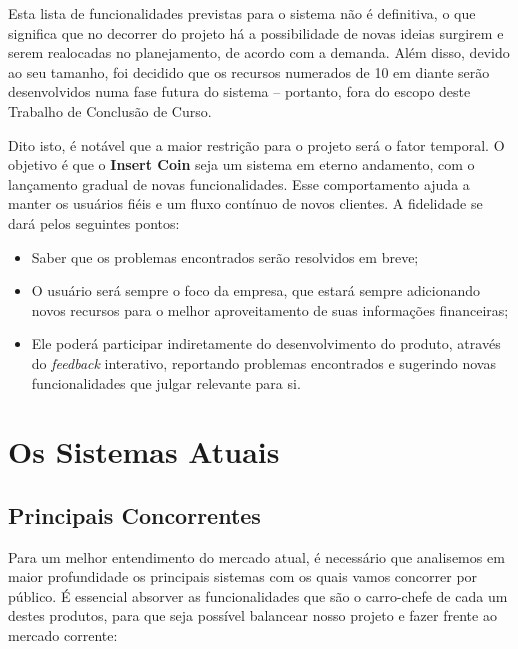 \documentclass[a4paper]{abnt}
\begin{document}
Esta lista de funcionalidades previstas para o sistema n\~ao é definitiva, o que significa que no decorrer do projeto há a possibilidade de novas ideias surgirem e serem realocadas no planejamento, de acordo com a demanda. Além disso, devido ao seu tamanho, foi decidido que os recursos numerados de 10 em diante ser\~ao desenvolvidos numa fase futura do sistema -- portanto, fora do escopo deste Trabalho de Conclus\~ao de Curso.

Dito isto, é notável que a maior restriç\~ao para o projeto será o fator temporal. O objetivo é que o \textbf{Insert Coin} seja um sistema em eterno andamento, com o lançamento gradual de novas funcionalidades. Esse comportamento ajuda a manter os usuários fiéis e um fluxo contínuo de novos clientes. A fidelidade se dará pelos seguintes pontos:
\begin{itemize}
	\item Saber que os problemas encontrados ser\~ao resolvidos em breve;
	\item O usuário será sempre o foco da empresa, que estará sempre adicionando novos recursos para o melhor aproveitamento de suas informaç\~oes financeiras;
	\item Ele poderá participar indiretamente do desenvolvimento do produto, através do \emph{feedback} interativo, reportando problemas encontrados e sugerindo novas funcionalidades que julgar relevante para si.
\end{itemize}

\chapter{Os Sistemas Atuais}

\section{Principais Concorrentes}
Para um melhor entendimento do mercado atual, é necessário que analisemos em maior profundidade os principais sistemas com os quais vamos concorrer por público. É essencial absorver as funcionalidades que s\~ao o carro-chefe de cada um destes produtos, para que seja possível balancear nosso projeto e fazer frente ao mercado corrente:
\end{document}
